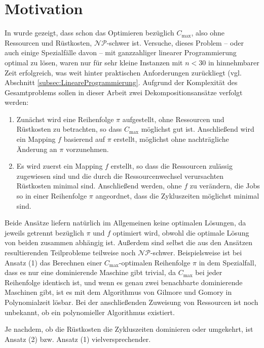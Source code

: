 \documentclass{scrreprt}
\begin{document}
\section{Motivation}
In \cite{...} wurde gezeigt, dass schon das Optimieren bezüglich $C_{\max}$, also ohne Ressourcen und Rüstkosten, $\mathcal{NP}$-schwer ist.
Versuche, dieses Problem -- oder auch einige Spezialfälle davon -- mit ganzzahliger linearer Programmierung optimal zu lösen, waren nur für sehr kleine Instanzen mit
$n<30$ in hinnehmbarer Zeit erfolgreich, was weit hinter praktischen Anforderungen zurückliegt (vgl. Abschnitt \ref{subsec:LineareProgrammierung}. 
Aufgrund der Komplexität des Gesamtproblems sollen in dieser Arbeit zwei Dekompositionsansätze verfolgt werden:
\begin{enumerate}
    \item Zunächst wird eine Reihenfolge $\pi$ aufgestellt, ohne Ressourcen und Rüstkosten zu betrachten, so dass $C_{\max}$ möglichst gut ist.
        Anschließend wird ein Mapping $f$ basierend auf $\pi$ erstellt, möglichst ohne nachträgliche Änderung an $\pi$ vorzunehmen.
    \item Es wird zuerst ein Mapping $f$ erstellt, so dass die Ressourcen zulässig zugewiesen sind und die durch die Ressourcenwechsel verursachten Rüstkosten minimal sind.
        Anschließend werden, ohne $f$ zu verändern, die Jobs so in einer Reihenfolge $\pi$ angeordnet, dass die Zykluszeiten möglichst minimal sind.
\end{enumerate}%
Beide Ansätze liefern natürlich im Allgemeinen keine optimalen Lösungen, da jeweils getrennt bezüglich $\pi$ und $f$ optimiert wird,
obwohl die optimale Lösung von beiden zusammen abhängig ist.
Außerdem sind selbst die aus den Ansätzen resultierenden Teilprobleme teilweise noch $\mathcal{NP}$-schwer.
Beispielsweise ist bei Ansatz (1) das Berechnen einer $C_{\max}$-optimalen Reihenfolge $\pi$ in dem Spezialfall,
dass es nur eine dominierende Maschine gibt trivial, da $C_{\max}$ bei jeder Reihenfolge identisch ist,
und wenn es genau zwei benachbarte dominierende Maschinen gibt,
ist es mit dem Algorithmus von Gilmore und Gomory \cite{...} in Polynomialzeit lösbar.
Bei der anschließenden Zuweisung von Ressourcen ist noch unbekannt, ob ein polynomieller Algorithmus existiert.

Je nachdem, ob die Rüstkosten die Zykluszeiten dominieren oder umgekehrt, ist Ansatz (2) bzw. Ansatz (1) vielversprechender.
\end{document}
